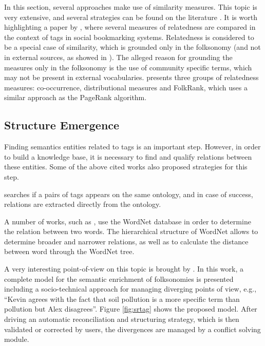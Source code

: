 In this section, several approaches make use of similarity measures.
This topic is very extensive, and several strategies can be found on the literature \cite{Harispe2015, Harispe2014, Trillo2007, Cilibrasi2007}.
It is worth highlighting a paper by , where several measures of relatedness are compared in the context of tags in social bookmarking systems.
Relatedness is considered to be a special case of similarity, which is grounded only in the folksonomy (and not in external sources, as showed in ).
The alleged reason for grounding the measures only in the folksonomy is the use of community specific terms, which may not be present in external vocabularies.
 presents three groups of relatedness measures: co-occurrence, distributional measures and FolkRank, which uses a similar approach as the PageRank algorithm.



\subsection{Structure Emergence}
\label{sec:emergence}

Finding semantics entities related to tags is an important step.
However, in order to build a knowledge base, it is necessary to find and qualify relations between these entities.
Some of the above cited works also proposed strategies for this step.

 searches if a pairs of tags appears on the same ontology, and in case of success, relations are extracted directly from the ontology.

A number of works, such as \cite{Limpens2013}, use the WordNet database in order to determine the relation between two words.
The hierarchical structure of WordNet allows to determine broader and narrower relations, as well as to calculate the distance between word through the WordNet tree.

A very interesting point-of-view on this topic is brought by .
In this work, a complete model for the semantic enrichment of folksonomies is presented including a socio-technical approach for managing diverging points of view, e.g., ``Kevin agrees with the fact that soil pollution is a more specific term than pollution but Alex disagrees''.
Figure \ref{fig:srtag} shows the proposed model.
After driving an automatic reconciliation and structuring strategy, which is then validated or corrected by users, the divergences are managed by a conflict solving module.

